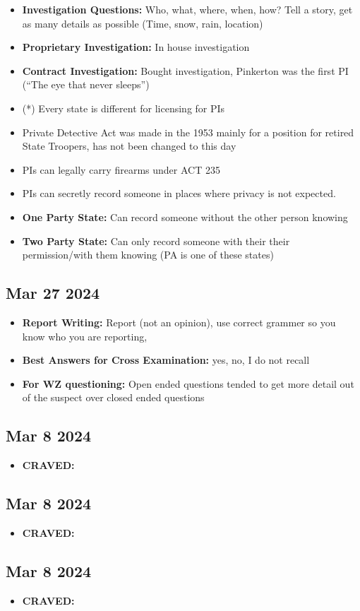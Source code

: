 \documentclass[12pt]{article}
\begin{document}
\begin{itemize}
		  \item \textbf{Investigation Questions:} Who, what, where, when, how? Tell a story, get as many
				details as possible (Time, snow, rain, location) 
		  \item \textbf{Proprietary Investigation:} In house investigation
		  \item \textbf{Contract Investigation:} Bought investigation, Pinkerton was the first PI (``The eye
				that never sleeps'')
		  \item (*) Every state is different for licensing for PIs   
		  \item Private Detective Act was made in the 1953 mainly for a position for retired State Troopers, has
		  		not been changed to this day
		  \item PIs can legally carry firearms under ACT 235
		  \item PIs can secretly record someone in places where privacy is not expected.
		  \item \textbf{One Party State:} Can record someone without the other person knowing  
		  \item \textbf{Two Party State:} Can only record someone with their their permission/with them knowing (PA
				is one of these states)	
\end{itemize}

\subsection*{Mar 27 2024}

\begin{itemize}
		  \item \textbf{Report Writing:} Report (not an opinion), use correct grammer so you know who you
				are reporting, 
		  \item \textbf{Best Answers for Cross Examination:} yes, no, I do not recall	
		  \item \textbf{For WZ questioning:} Open ended questions tended to get more detail out of the suspect
		  		over closed ended questions
\end{itemize}

\subsection*{Mar 8 2024}

\begin{itemize}
		  \item \textbf{CRAVED:}  
\end{itemize}

\subsection*{Mar 8 2024}

\begin{itemize}
		  \item \textbf{CRAVED:}  
\end{itemize}

\subsection*{Mar 8 2024}

\begin{itemize}
		  \item \textbf{CRAVED:}  
\end{itemize}
\end{document}
